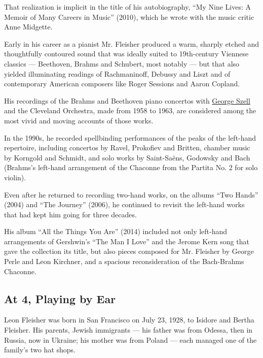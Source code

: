 That realization is implicit in the title of his autobiography, ``My
Nine Lives: A Memoir of Many Careers in Music'' (2010), which he wrote
with the music critic Anne Midgette.

Early in his career as a pianist Mr. Fleisher produced a warm, sharply
etched and thoughtfully contoured sound that was ideally suited to
19th-century Viennese classics --- Beethoven, Brahms and Schubert, most
notably --- but that also yielded illuminating readings of Rachmaninoff,
Debussy and Liszt and of contemporary American composers like Roger
Sessions and Aaron Copland.

His recordings of the Brahms and Beethoven piano concertos with
\href{https://www.nytimes.com/1970/07/31/archives/george-szell-conductor-is-dead-george-szell-of-cleveland-orchestra.html\#:~:text=George\%20Szell\%2C\%20conductor\%20of\%20the,He\%20was\%2073\%20years\%20old.}{George
Szell} and the Cleveland Orchestra, made from 1958 to 1963, are
considered among the most vivid and moving accounts of those works.

In the 1990s, he recorded spellbinding performances of the peaks of the
left-hand repertoire, including concertos by Ravel, Prokofiev and
Britten, chamber music by Korngold and Schmidt, and solo works by
Saint-Saëns, Godowsky and Bach (Brahms's left-hand arrangement of the
Chaconne from the Partita No. 2 for solo violin).

Even after he returned to recording two-hand works, on the albums ``Two
Hands'' (2004) and ``The Journey'' (2006), he continued to revisit the
left-hand works that had kept him going for three decades.

His album ``All the Things You Are'' (2014) included not only left-hand
arrangements of Gershwin's ``The Man I Love'' and the Jerome Kern song
that gave the collection its title, but also pieces composed for Mr.
Fleisher by George Perle and Leon Kirchner, and a spacious
reconsideration of the Bach-Brahms Chaconne.

\hypertarget{at-4-playing-by-ear}{%
\subsection{At 4, Playing by Ear}\label{at-4-playing-by-ear}}

Leon Fleisher was born in San Francisco on July 23, 1928, to Isidore and
Bertha Fleisher. His parents, Jewish immigrants --- his father was from
Odessa, then in Russia, now in Ukraine; his mother was from Poland ---
each managed one of the family's two hat shops.

